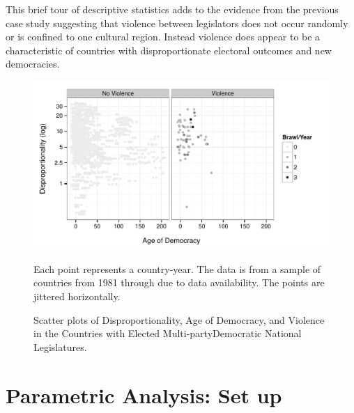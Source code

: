 \documentclass[a4paper]{article}\usepackage[]{graphicx}\usepackage[]{color}
\newenvironment{knitrout}{}{} %
\begin{document}
This brief tour of descriptive statistics adds to the evidence from the previous case study suggesting that violence between legislators does not occur randomly or is confined to one cultural region. Instead violence does appear to be a characteristic of countries with disproportionate electoral outcomes and new democracies.

\begin{figure}[t]
    \begin{center}

\begin{knitrout}
\color{fgcolor}
\includegraphics[width=0.8\linewidth]{figure/FrameworkEmpirical-1} 

\end{knitrout}
    \end{center}

    \caption{Scatter plots of Disproportionality, Age of Democracy, and Violence in the Countries with {Elected Multi-party}{Democratic} National Legislatures.}
    \label{framework_empirical}

    \begin{singlespace}
        {\scriptsize{Each point represents a country-year. The data is from a sample of countries from 1981 through  due to data availability. The points are jittered horizontally.}}
    \end{singlespace}

\end{figure}



\section*{Parametric Analysis: Set up}
\end{document}

